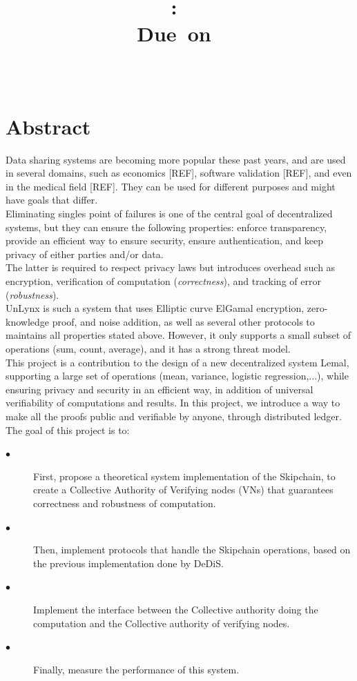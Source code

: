 \documentclass{article}
\title{
\logoepfl
\vspace{2in}
\textmd{\textbf{\hmwkClass:\ \hmwkTitle}}\\
\normalsize\vspace{0.1in}\small{Due\ on\ \hmwkDueDate}\\
\vspace{0.1in}\large{\textit{\hmwkClassInstructor\ \hmwkClassTime}}
\author{\textbf{\hmwkAuthorName}}
\vspace{3in}
}
\begin{document}
\maketitle

\newpage
\section*{Abstract}
Data sharing systems are becoming more popular these past years, and are used in several domains, such as economics [REF], software validation [REF], and even in the medical field [REF]. They can be used for different purposes and might have goals that differ.\\
Eliminating singles point of failures is one of the central goal of decentralized systems,  but they can ensure the following properties: enforce transparency, provide an efficient way to ensure security, ensure authentication, and keep privacy of either parties and/or data.\\
The latter is required to respect privacy laws but introduces overhead such as encryption, verification of computation (\textit{correctness}), and tracking of error (\textit{robustness}).\\
UnLynx is such a system that uses Elliptic curve ElGamal encryption, zero-knowledge proof, and noise addition, as well as several other protocols to maintains all properties stated above. However, it only supports a small subset of operations (sum, count, average), and it has a strong threat model.\\
This project is a contribution to the design of a new decentralized system Lemal, supporting a large set of operations (mean, variance, logistic regression,...), while ensuring privacy and security in an efficient way, in addition of universal verifiability of computations and results.
In this project, we introduce a way to make all the proofs public and verifiable by anyone, through distributed ledger.
The goal of this project is to:
\begin{description}
\item[$\bullet$] First, propose a theoretical system implementation of the Skipchain, to create a Collective Authority of Verifying nodes (VNs) that guarantees correctness and robustness of computation.
\item[$\bullet$] Then, implement protocols that handle the Skipchain operations, based on the previous implementation done by DeDiS.
\item[$\bullet$] Implement the interface between the Collective authority doing the computation and the Collective authority of verifying nodes.
\item[$\bullet$] Finally, measure the performance of this system.
\end{description}
\end{document}
